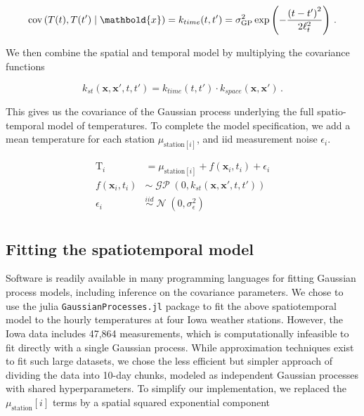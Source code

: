 \documentclass[letter]{article}
\newcommand{\genericdel}[3]{%
      \left#1#3\right#2
    }
\newcommand{\del}[1]{\genericdel(){#1}}
\newcommand{\sbr}[1]{\genericdel[]{#1}}
\DeclareMathOperator{\cov}{{cov}}
\DeclareMathOperator{\normal}{\mathcal{N}}
\DeclareMathOperator{\GP}{\mathcal{GP}}
\newcommand{\T}{\mathrm{T}}
\newcommand{\station}[1]{\mathrm{station}\sbr{#1}}
\newcommand{\xvec}{\mathbold{x}}
\newcommand{\iid}{iid}
\newcommand{\sigmaf}{\sigma_{\mathrm{GP}}}
\newcommand{\sigman}{\sigma_{\epsilon}}
\newcommand{\eqlabel}[1]{\label{#1}}
\begin{document}
\begin{equation}
\cov\del{T(t), T(t') \mid \xvec} = k_{time}(t, t') = \sigmaf^2 \exp\del{-\frac{\del{t-t'}^2}{2\ell_t^2}}\,.
\end{equation}

We then combine the spatial and temporal model by multiplying the covariance functions

\begin{equation}
k_{st}(\xvec,\xvec',t,t') = k_{time}(t,t') \cdot k_{space}(\xvec, \xvec')\,.
\end{equation}

This gives us the covariance of the Gaussian process underlying the full spatio-temporal model of temperatures.
To complete the model specification, we add a mean temperature for each station \(\mu_{\station{i}}\), and iid measurement noise \(\epsilon_i\).

\begin{equation}
\begin{split}
    \T_i &= \mu_{\station{i}} + f(\xvec_i, t_i) + \epsilon_i\\
    f(\xvec_i, t_i) &\sim \GP\del{0, k_{st}(\xvec,\xvec',t,t')}\\
    \epsilon_i &\overset{\iid}{\sim} \normal\del{0,\sigman^2}\\
\end{split}
\eqlabel{eq:gpmodel}
\end{equation}
    


        \subsection{Fitting the spatiotemporal model}\label{fitting-the-spatiotemporal-model}

Software is readily available in many programming languages for fitting Gaussian process models, including inference on the covariance parameters. We chose to use the julia \texttt{GaussianProcesses.jl} package to fit the above spatiotemporal model to the hourly temperatures at four Iowa weather stations. However, the Iowa data includes 47,864 measurements, which is computationally infeasible to fit directly with a single Gaussian process. While approximation techniques exist to fit such large datasets, we chose the less efficient but simpler approach of dividing the data into 10-day chunks, modeled as independent Gaussian processes with shared hyperparameters. To simplify our implementation, we replaced the \(\mu_\station{i}\) terms by a spatial squared exponential component
\end{document}
